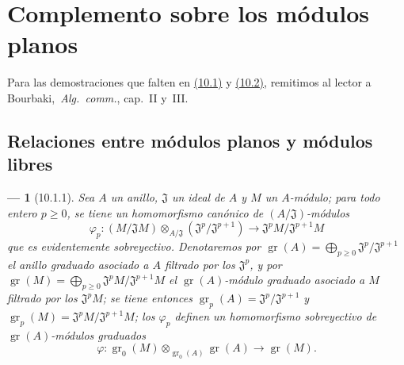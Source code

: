 \documentclass[10pt,oneside,openany]{book}
\theoremstyle{egaenv}\newtheorem*{env}{---}
\theoremstyle{egastatement}
\theoremstyle{egadescription}
\renewcommand{\geq}{\geqslant}
\begin{document}


\section{Complemento sobre los módulos planos}
\label{section:0.10}
\label{section:0.10-fr}

Para las demostraciones que falten en \hyperref[subsection:0.10.1]{(10.1)} y \hyperref[subsection:0.10.2]{(10.2)}, remitimos al lector a Bourbaki,~\emph{Alg.~comm.}, cap.~II y~III.

\subsection{Relaciones entre módulos planos y módulos libres}
\label{subsection:0.10.1}
\label{subsection:0.10.1-fr}

\begin{env}[10.1.1]
\label{0.10.1.1}
\label{0.10.1.1-fr}
Sea $A$ un anillo, $\mathfrak{J}$ un ideal de $A$ y $M$ un $A$-módulo;
para todo entero $p\geq0$, se tiene un homomorfismo canónico de $(A/\mathfrak{J})$-módulos
\[
\label{0.10.1.1.1-fr}
  \varphi_p:(M/\mathfrak{J}M)\otimes_{A/\mathfrak{J}}
  (\mathfrak{J}^p/\mathfrak{J}^{p+1})
  \longrightarrow \mathfrak{J}^pM/\mathfrak{J}^{p+1}M
  \tag{10.1.1.1}
\]
que es evidentemente \emph{sobreyectivo}.
Denotaremos por $\operatorname{gr}(A)=\bigoplus_{p\geq0}\mathfrak{J}^p/\mathfrak{J}^{p+1}$ el anillo graduado asociado a $A$ filtrado por los $\mathfrak{J}^p$, y por $\operatorname{gr}(M)=\bigoplus_{p\geq0}\mathfrak{J}^pM/\mathfrak{J}^{p+1}M$ el $\operatorname{gr}(A)$-módulo graduado asociado a $M$ filtrado por los $\mathfrak{J}^pM$;
se tiene entonces $\operatorname{gr}_p(A)=\mathfrak{J}^p/\mathfrak{J}^{p+1}$ y $\operatorname{gr}_p(M)=\mathfrak{J}^pM/\mathfrak{J}^{p+1}M$;
los $\varphi_p$ definen un homomorfismo \emph{sobreyectivo} de $\operatorname{gr}(A)$-módulos graduados
\[
\label{0.10.1.1.2-fr}
  \varphi:\operatorname{gr}_0(M)\otimes_{\operatorname{gr}_0(A)}
  \operatorname{gr}(A)\longrightarrow\operatorname{gr}(M).
  \tag{10.1.1.2}
\]
\end{env}
\end{document}
